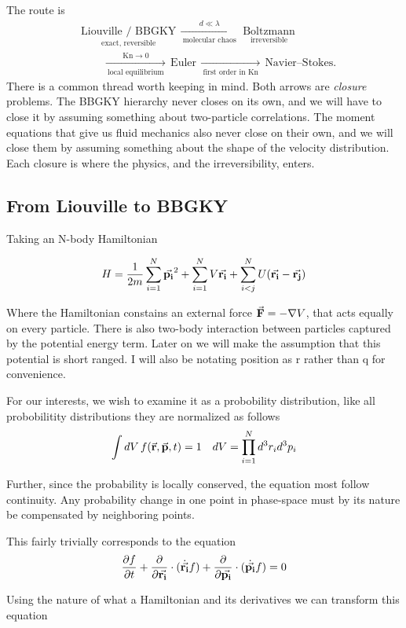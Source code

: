 The route is
\[
\begin{aligned}
&\underset{\text{exact, reversible}}{\text{Liouville / BBGKY}}
\, \xrightarrow[\ \text{molecular chaos}\ ]{\ d\ll\lambda\ }\,
\underset{\text{irreversible}}{\text{Boltzmann}} \\
&\qquad\xrightarrow[\ \text{local equilibrium}\ ]{\ \mathrm{Kn}\to 0\ }\,
\text{Euler}
\, \xrightarrow[\ \text{first order in Kn}\ ]{}\,
\text{Navier--Stokes}.
\end{aligned}
\]
There is a common thread worth keeping in mind. Both arrows are \emph{closure} problems. The BBGKY hierarchy never closes on its own, and we will have to close it by assuming something about two-particle correlations. The moment equations that give us fluid mechanics also never close on their own, and we will close them by assuming something about the shape of the velocity distribution. Each closure is where the physics, and the irreversibility, enters.


\subsection{From Liouville to BBGKY}

Taking an N-body Hamiltonian

\[
H = \frac{1}{2m}\sum^N_{i=1} \va{p_i}^2 + \sum^N_{i=1} V\va{r_i} + \sum^N_{i<j} U(\va{r_i} - \va{r_j})
  \]

  Where the Hamiltonian constains an external force $\va{F} = - \nabla V$, that acts equally on every particle. There is also two-body interaction between particles captured by the potential energy term. Later on we will make the assumption that this potential is short ranged. I will also be notating position as r rather than q for convenience.

For our interests, we wish to examine it as a probobility distribution, like all probobilitity distributions they are normalized as follows
\[
\int dV \, f(\va{r},\va{p},t) = 1 \quad dV = \prod_{i=1}^N d^3 r_i d^3 p_i
  \]

  Further, since the probability is locally conserved, the equation most follow continuity. Any probability change in one point in phase-space must by its nature be compensated by neighboring points.

  This fairly trivially corresponds to the equation
\[
\pdv{f}{t} +\pdv{}{\va{r_i}} \cdot (\dot{\va{r_i}}f) +\pdv{}{\va{p_i}} \cdot (\dot{\va{p_i}}f) = 0
  \]

  Using the nature of what a Hamiltonian and its derivatives we can transform this equation

